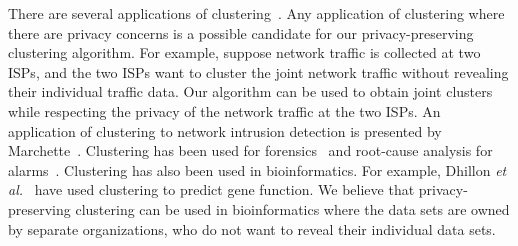 There are several applications of
clustering~\cite{pattern-classification}. Any application of
clustering where there are privacy concerns is a possible candidate
for our privacy-preserving clustering algorithm. For example, suppose
network traffic is collected at two ISPs, and the two ISPs want to
cluster the joint network traffic without revealing their individual
traffic data. Our algorithm can be used to obtain joint clusters while
respecting the privacy of the network traffic at the two ISPs. An
application of clustering to network intrusion detection is presented
by Marchette~\cite{Marchette99}.  Clustering has been used for
forensics~\cite{Pouget:Dacier} and root-cause analysis for
alarms~\cite{Julisch:TISSEC}. Clustering has also been used in
bioinformatics. For example, Dhillon {\it et al.}~\cite{Dhillon:Bio}
have used clustering to predict gene function. We believe that
privacy-preserving clustering can be used in bioinformatics where the
data sets are owned by separate organizations, who do not want to
reveal their individual data sets.


